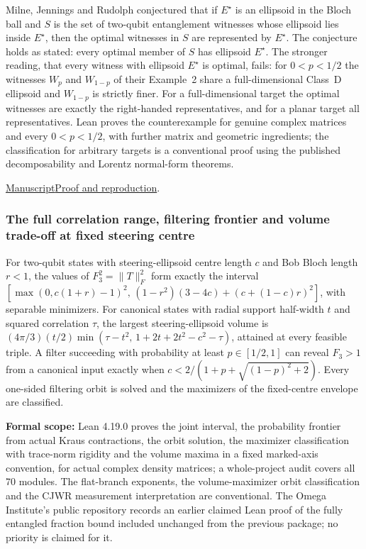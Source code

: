 \documentclass[11pt,a4paper]{article}
\begin{document}
Milne, Jennings and Rudolph conjectured that if $E^\star$ is an ellipsoid in the Bloch ball and $S$ is the set of two-qubit entanglement witnesses whose ellipsoid lies inside $E^\star$, then the optimal witnesses in $S$ are represented by $E^\star$. The conjecture holds as stated: every optimal member of $S$ has ellipsoid $E^\star$. The stronger reading, that every witness with ellipsoid $E^\star$ is optimal, fails: for $0<p<1/2$ the witnesses $W_p$ and $W_{1-p}$ of their Example~2 share a full-dimensional Class~D ellipsoid and $W_{1-p}$ is strictly finer. For a full-dimensional target the optimal witnesses are exactly the right-handed representatives, and for a planar target all representatives. Lean proves the counterexample for genuine complex matrices and every $0<p<1/2$, with further matrix and geometric ingredients; the classification for arbitrary targets is a conventional proof using the published decomposability and Lorentz normal-form theorems.

\noindent\href{https://github.com/dvgyl/math-and-theory/blob/main/papers/physics/ellipsoid-witness-optimality/manuscript.pdf}{Manuscript}\quad\href{https://github.com/dvgyl/math-and-theory/blob/main/papers/physics/ellipsoid-witness-optimality/README.md}{Proof and reproduction}.

\subsubsection{The full correlation range, filtering frontier and volume trade-off at fixed steering centre}

For two-qubit states with steering-ellipsoid centre length $c$ and Bob Bloch length $r<1$, the values of $F_3^2=\|T\|_F^2$ form exactly the interval $[\max(0,c(1+r)-1)^2,\,(1-r^2)(3-4c)+(c+(1-c)r)^2]$, with separable minimizers. For canonical states with radial support half-width $t$ and squared correlation $\tau$, the largest steering-ellipsoid volume is $(4\pi/3)(t/2)\min(\tau-t^2,\,1+2t+2t^2-c^2-\tau)$, attained at every feasible triple. A filter succeeding with probability at least $p\in[1/2,1]$ can reveal $F_3>1$ from a canonical input exactly when $c<2/(1+p+\sqrt{(1-p)^2+2})$. Every one-sided filtering orbit is solved and the maximizers of the fixed-centre envelope are classified.

\noindent\textbf{Formal scope:} Lean 4.19.0 proves the joint interval, the probability frontier from actual Kraus contractions, the orbit solution, the maximizer classification with trace-norm rigidity and the volume maxima in a fixed marked-axis convention, for actual complex density matrices; a whole-project audit covers all 70 modules. The flat-branch exponents, the volume-maximizer orbit classification and the CJWR measurement interpretation are conventional. The Omega Institute's public repository records an earlier claimed Lean proof of the fully entangled fraction bound included unchanged from the previous package; no priority is claimed for it.
\end{document}
